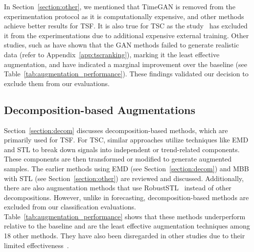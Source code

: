 In Section~\ref{section:other}, we mentioned that TimeGAN is removed from the experimentation protocol as it is computationally expensive, and other methods achieve better results for TSF. It is also true for TSC as the study~\cite{10.1371/journal.pone.0254841} has excluded it from the experimentations due to additional expensive external training. Other studies, such as \cite{gao2024dataaugmentationtimeseriesclassification} have shown that the GAN methods failed to generate realistic data (refer to Appendix~\ref{app:tscranking}), marking it the least effective augmentation, and \cite{10.1371/journal.pone.0315343} have indicated a marginal improvement over the baseline (see Table~\ref{tab:augmentation_performance}). These findings validated our decision to exclude them from our evaluations.







\subsection{Decomposition-based Augmentations}

Section~\ref{section:decom} discusses decomposition-based methods, which are primarily used for TSF. For TSC, similar approaches utilize techniques like EMD and STL to break down signals into independent or trend-related components. These components are then transformed or modified to generate augmented samples. The earlier methods using EMD (see Section~\ref{section:decom}) and MBB with STL (see Section~\ref{section:other}) are reviewed and discussed. Additionally, there are also augmentation methods that use RobustSTL~\cite{wen2018robuststlrobustseasonaltrenddecomposition} instead of other decompositions. However, unlike in forecasting, decomposition-based methods are excluded from our classification evaluations. Table~\ref{tab:augmentation_performance} shows that these methods underperform relative to the baseline and are the least effective augmentation techniques among 18 other methods. They have also been disregarded in other studies due to their limited effectiveness~\cite{nam2020data, 10.1371/journal.pone.0315343, 10.1371/journal.pone.0254841}.




